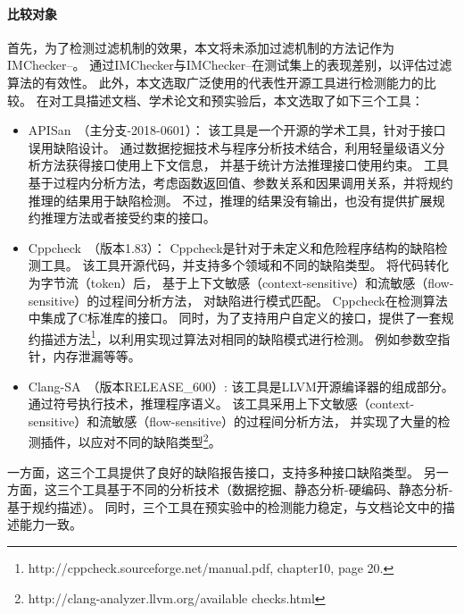 \paragraph{ 比较对象}
首先，为了检测过滤机制的效果，本文将未添加过滤机制的方法记作为IMChecker--。
通过IMChecker与IMChecker--在测试集上的表现差别，以评估过滤算法的有效性。
此外，本文选取广泛使用的代表性开源工具进行检测能力的比较。
在对工具描述文档、学术论文和预实验后，本文选取了如下三个工具：
\begin{itemize}
	\item APISan~\cite{16-sec-apisan}（主分支-2018-0601）：
	该工具是一个开源的学术工具，针对于接口误用缺陷设计。
	通过数据挖掘技术与程序分析技术结合，利用轻量级语义分析方法获得接口使用上下文信息，
	并基于统计方法推理接口使用约束。
	工具基于过程内分析方法，考虑函数返回值、参数关系和因果调用关系，并将规约推理的结果用于缺陷检测。
	不过，推理的结果没有输出，也没有提供扩展规约推理方法或者接受约束的接口。
	\item Cppcheck~\cite{cppcheck}（版本1.83）：
	Cppcheck是针对于未定义和危险程序结构的缺陷检测工具。
	该工具开源代码，并支持多个领域和不同的缺陷类型。
	将代码转化为字节流（token）后，
	基于上下文敏感（context-sensitive）和流敏感（flow-sensitive）的过程间分析方法，
	对缺陷进行模式匹配。
	Cppcheck在检测算法中集成了C标准库的接口。
	同时，为了支持用户自定义的接口，提供了一套规约描述方法\footnote{http://cppcheck.sourceforge.net/manual.pdf, chapter10, page 20.}，以利用实现过算法对相同的缺陷模式进行检测。
	例如参数空指针，内存泄漏等等。
	\item Clang-SA~\cite{clang-sa}（版本RELEASE\_600）:
	该工具是LLVM开源编译器的组成部分。
	通过符号执行技术，推理程序语义。
	该工具采用上下文敏感（context-sensitive）和流敏感（flow-sensitive）的过程间分析方法，
	并实现了大量的检测插件，以应对不同的缺陷类型\footnote{http://clang-analyzer.llvm.org/available checks.html}。
\end{itemize} 
一方面，这三个工具提供了良好的缺陷报告接口，支持多种接口缺陷类型。
另一方面，这三个工具基于不同的分析技术（数据挖掘、静态分析-硬编码、静态分析-基于规约描述）。
同时，三个工具在预实验中的检测能力稳定，与文档论文中的描述能力一致。

